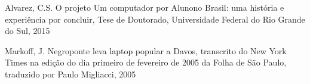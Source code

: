\documentclass[
12pt,		%
openright,	%
twoside,  %
a4paper,			%
chapter=TITLE,		%
english,			%
french,				%
spanish,			%
brazil				%
]{USPSC-classe/USPSC}
\begin{document}
\begin{flushleft}
\begin{flushleft}
\begin{flushleft}
\begin{flushleft}
\begin{flushleft}
\begin{flushleft}
\begin{flushleft}
\begin{flushleft}
\begin{flushleft}
[ALVAREZ, 2015] Alvarez, C.S. O projeto \textquotedbl Um computador por Aluno\textquotedbl  no Brasil: uma hist\'oria e experi\^encia por concluir, Tese de Doutorado, Universidade Federal do Rio Grande do Sul, 2015
\end{flushleft}


\end{flushleft}


\end{flushleft}


\end{flushleft}


\end{flushleft}


\end{flushleft}


\end{flushleft}


\end{flushleft}


\end{flushleft}


\begin{flushleft}
\begin{flushleft}
\begin{flushleft}
\begin{flushleft}
\begin{flushleft}
\begin{flushleft}
\begin{flushleft}
\begin{flushleft}
\begin{flushleft}
[MARKOFF, 2005] Markoff, J. Negroponte leva laptop popular a Davos, transcrito do New York Times na edi\c{c}\~ao do dia primeiro de fevereiro de 2005 da Folha de S\~ao Paulo, traduzido por Paulo Migliacci, 2005
\end{flushleft}


\end{flushleft}


\end{flushleft}


\end{flushleft}


\end{flushleft}


\end{flushleft}


\end{flushleft}


\end{flushleft}


\end{flushleft}
\end{document}
